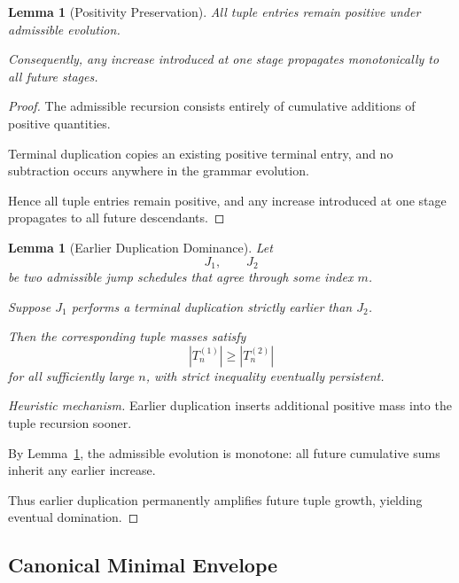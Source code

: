 \documentclass[12pt, oneside]{article}
\numberwithin{equation}{section}
\theoremstyle{definition}
\theoremstyle{plain}
\newtheorem{lemma}[theorem]{Lemma}
\theoremstyle{remark}
\begin{document}
\begin{lemma}[Positivity Preservation]
\label{lem:positivity}
All tuple entries remain positive under admissible evolution.

Consequently, any increase introduced at one stage propagates
monotonically to all future stages.
\end{lemma}

\begin{proof}
The admissible recursion consists entirely of cumulative additions
of positive quantities.

Terminal duplication copies an existing positive terminal entry,
and no subtraction occurs anywhere in the grammar evolution.

Hence all tuple entries remain positive, and any increase introduced
at one stage propagates to all future descendants.
\end{proof}


\begin{lemma}[Earlier Duplication Dominance]
\label{lem:earlier-duplication}
Let
\[
J_1,\qquad J_2
\]
be two admissible jump schedules that agree through some index $m$.

Suppose $J_1$ performs a terminal duplication strictly earlier than
$J_2$.

Then the corresponding tuple masses satisfy
\[
|T_n^{(1)}|
\ge
|T_n^{(2)}|
\]
for all sufficiently large $n$, with strict inequality eventually
persistent.
\end{lemma}

\begin{proof}[Heuristic mechanism]
Earlier duplication inserts additional positive mass into the tuple
recursion sooner.

By Lemma~\ref{lem:positivity}, the admissible evolution is monotone:
all future cumulative sums inherit any earlier increase.

Thus earlier duplication permanently amplifies future tuple growth,
yielding eventual domination.
\end{proof}


\subsection{Canonical Minimal Envelope}

\end{document}
